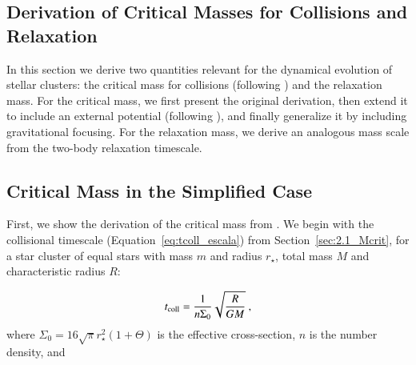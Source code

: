 \begin{appendixs}
	\section{Derivation of Critical Masses for Collisions and Relaxation}
	
	In this section we derive two quantities relevant for the dynamical evolution of stellar clusters: the critical mass for collisions (following \citet{escala2021observational}) and the relaxation mass. For the critical mass, we first present the original derivation, then extend it to include an external potential (following \citet{reinoso2020effects}), and finally generalize it by including gravitational focusing. For the relaxation mass, we derive an analogous mass scale from the two-body relaxation timescale.
	
	\subsection{Critical Mass in the Simplified Case}
	\label{sec:Mcrit_first}
	
	First, we show the derivation of the critical mass from \citet{escala2021observational}. We begin with the collisional timescale (Equation~\eqref{eq:tcoll_escala}) from Section~\ref{sec:2.1_Mcrit}, for a star cluster of equal stars with mass $m$ and radius $r_{\star}$, total mass $M$ and characteristic radius $R$:
	
	\begin{equation}
		t_{\rm coll} = \frac{1}{n \Sigma_0}\sqrt{\frac{R}{GM}}~,
	\end{equation}
	where $\Sigma_0=16\sqrt{\pi}r_{\star}^2(1+\Theta)$ is the effective cross-section, $n$ is the number density, and
	

\end{appendixs}
